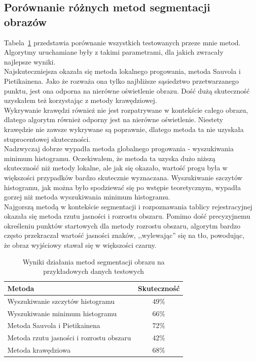 \subsection{Porównanie różnych metod segmentacji obrazów}
Tabela~\ref{tab:all_methods_comparision} przedstawia porównanie wszystkich testowanych przeze mnie metod. Algorytmy uruchamiane były z takimi parametrami, dla jakich zwracały najlepsze wyniki. \\
Najskuteczniejsza okazała się metoda lokalnego progowania, metoda Sauvola i Pietikainena. Jako że rozważa ona tylko najbliższe sąsiedztwo przetwarzanego punktu, jest ona odporna na nierówne oświetlenie obrazu. Dość dużą skuteczność uzyskałem też korzystając z metody krawędziowej. \\
Wykrywanie krawędzi również nie jest rozpatrywane w kontekście całego obrazu, dlatego algorytm również odporny jest na nierówne oświetlenie. Niestety krawędzie nie zawsze wykrywane są poprawnie, dlatego metoda ta nie uzyskała stuprocentowej skuteczności. \\
Nadzwyczaj dobrze wypadła metoda globalnego progowania - wyszukiwania minimum histogramu. Oczekiwałem, że metoda ta uzyska dużo niższą skuteczność niż metody lokalne, ale jak się okazało, wartość progu była w większości przypadków bardzo skutecznie wyznaczana. Wyszukiwanie szczytów histogramu, jak można było spodziewać się po wstępie teoretycznym, wypadła gorzej niż metoda wyszukiwania minimum histogramu. \\
Najgorszą metodą w kontekście segmentacji i rozpoznawania tablicy rejestracyjnej okazała się metoda rzutu jasności i rozrostu obszaru. Pomimo dość precyzyjnemu określeniu punktów startowych dla metody rozrostu obszaru, algorytm bardzo często przekraczał wartość jasności znaków, ,,wylewając'' się na tło, powodując, że obraz wyjściowy stawał się w większości czarny.

\begin {table}[H]
  \begin{center}
    \begin{tabular}{l | c}
      Metoda & Skuteczność \\
      \hline
      Wyszukiwanie szczytów histogramu & 49\% \\
      Wyszukiwanie minimum histogramu & 66\% \\
      Metoda Sauvola i Pietikainena & 72\% \\
      Metoda rzutu jasności i rozrostu obszaru & 42\% \\
      Metoda krawędziowa & 68\%
    \end{tabular}
    \caption {Wyniki działania metod segmentacji obrazu na przykładowych danych testowych}
    \label{tab:all_methods_comparision} 
  \end{center}
\end {table}

